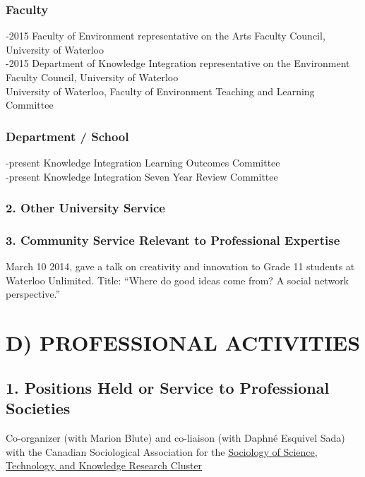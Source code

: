 \documentclass[9pt,usenames,dvipsnames]{article}
\begin{document}
\subsubsection*{Faculty}

-2015 Faculty of Environment representative on the Arts Faculty Council, University of Waterloo \\

-2015 Department of Knowledge Integration representative on the Environment Faculty Council, University of Waterloo \\

 University of Waterloo, Faculty of Environment Teaching and Learning Committee

\subsubsection*{Department / School}

-present Knowledge Integration Learning Outcomes Committee \\

-present Knowledge Integration Seven Year Review Committee 

\subsubsection*{2. Other University Service}

\subsubsection*{3. Community Service Relevant to Professional Expertise}

\ind March 10 2014, gave a talk on creativity and innovation to Grade 11 students at Waterloo Unlimited. Title: ``Where do good ideas come from? A social network perspective.''

\section*{D) PROFESSIONAL ACTIVITIES} 

\subsection*{1. Positions Held or Service to Professional Societies}

\noindent Co-organizer (with Marion Blute) and co-liaison (with Daphné Esquivel Sada) with the Canadian Sociological Association for the \href{http://www.csa-scs.ca/files/webapps/csapress/sstk/}{Sociology of Science, Technology, and Knowledge Research Cluster}\\
\end{document}
